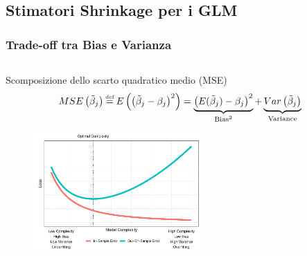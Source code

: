 \documentclass[pdf, aspectratio=169]{beamer}\usepackage[]{graphicx}\usepackage[]{color}
\newcommand\eqdef{\mathrel{\overset{\makebox[0pt]{\mbox{\normalfont\tiny def}}}{=}}}
\theoremstyle{definition}
\begin{document}
\subsection{Stimatori Shrinkage per i GLM}

\begin{frame}
\frametitle{Trade-off tra Bias e Varianza}

\fontsize{9pt}{11pt}\selectfont

\begin{columns}
\begin{column}{0.8\linewidth}
  \begin{block}{Scomposizione dello scarto quadratico medio (MSE)}
    $$
    MSE\left(\tilde{\beta}_j\right) \eqdef E\left(\left(\tilde{\beta}_j - \beta_j\right)^2\right) =
    \underbrace{\left( E(\tilde{\beta}_j)-\beta_j \right)^2}_{\text{Bias}^2} +
    \underbrace{Var\left( \tilde{\beta}_j \right)}_{\text{Variance}}
    $$
    \begin{figure}
      \centering
      \includegraphics[width=6.5cm]{_bookdown_files/_main_files/figure-latex/bias-variance-1.pdf}
    \end{figure}
  \end{block}
\end{column}
\end{columns}

\end{frame}
\end{document}

